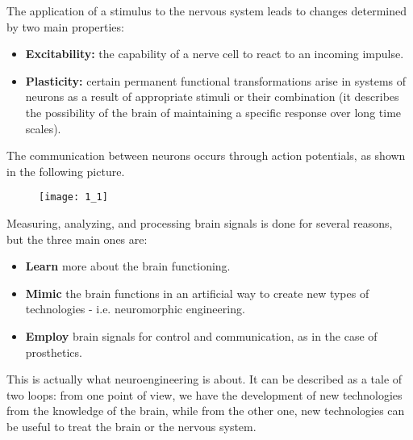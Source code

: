 The application of a stimulus to the nervous system leads to changes 
determined by two main properties:
\begin{itemize}
    \item \textbf{Excitability:} the capability of a nerve cell to react 
to an incoming impulse.
    \item \textbf{Plasticity:} certain permanent functional 
transformations arise in systems of neurons as a result of appropriate 
stimuli or their combination (it describes the possibility of the brain of 
maintaining a specific response over long time scales).
\end{itemize}
The communication between neurons occurs through action potentials, as 
shown in the following picture.
\begin{figure}[H]
    \texttt{[image: 1\_1]}
    \centering
\end{figure}
Measuring, analyzing, and processing brain signals is done for several 
reasons, but the three main ones are:
\begin{itemize}
    \item \textbf{Learn} more about the brain functioning.
    \item \textbf{Mimic} the brain functions in an artificial way to 
create new types of technologies - i.e. neuromorphic engineering.
    \item \textbf{Employ} brain signals for control and communication, as 
in the case of prosthetics.
\end{itemize}
This is actually what neuroengineering is about. It can be described as a 
tale of two loops: from one point of view, we have the development of new 
technologies from the knowledge of the brain, while from the other one, 
new technologies can be useful to treat the brain or the nervous system.\\

